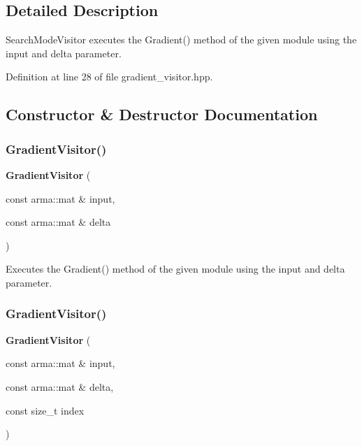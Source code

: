 \subsection{Detailed Description}
Search\+Mode\+Visitor executes the Gradient() method of the given module using the input and delta parameter. 

Definition at line 28 of file gradient\+\_\+visitor.\+hpp.



\subsection{Constructor \& Destructor Documentation}
\mbox{\label{classmlpack_1_1ann_1_1GradientVisitor_aef51b166a43ea70ddbb05b7dfc8f82b7}} 
\subsubsection{Gradient\+Visitor()\hspace{0.1cm}{\footnotesize\ttfamily [1/2]}}
{\footnotesize\ttfamily \textbf{ Gradient\+Visitor} (\begin{DoxyParamCaption}\item[{const arma\+::mat \&}]{input,  }\item[{const arma\+::mat \&}]{delta }\end{DoxyParamCaption})}



Executes the Gradient() method of the given module using the input and delta parameter. 

\mbox{\label{classmlpack_1_1ann_1_1GradientVisitor_a39e14abb4d965e541b0905125fbb03a0}} 
\subsubsection{Gradient\+Visitor()\hspace{0.1cm}{\footnotesize\ttfamily [2/2]}}
{\footnotesize\ttfamily \textbf{ Gradient\+Visitor} (\begin{DoxyParamCaption}\item[{const arma\+::mat \&}]{input,  }\item[{const arma\+::mat \&}]{delta,  }\item[{const size\+\_\+t}]{index }\end{DoxyParamCaption})}



